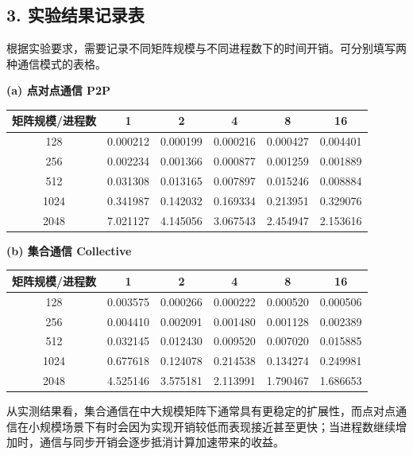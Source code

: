 \documentclass[12pt,a4paper]{ctexart}
\begin{document}
\subsection*{3. 实验结果记录表}
根据实验要求，需要记录不同矩阵规模与不同进程数下的时间开销。可分别填写两种通信模式的表格。

\textbf{(a) 点对点通信 P2P}
\begin{table}[htbp]
  \centering
  \renewcommand{\arraystretch}{1.2}
  \begin{tabular}{c|c|c|c|c|c}
    \toprule
    矩阵规模/进程数 & 1 & 2 & 4 & 8 & 16 \\
    \midrule
    128  & 0.000212 & 0.000199 & 0.000216 & 0.000427 & 0.004401 \\
    256  & 0.002234 & 0.001366 & 0.000877 & 0.001259 & 0.001889 \\
    512  & 0.031308 & 0.013165 & 0.007897 & 0.015246 & 0.008884 \\
    1024 & 0.341987 & 0.142032 & 0.169334 & 0.213951 & 0.329076 \\
    2048 & 7.021127 & 4.145056 & 3.067543 & 2.454947 & 2.153616 \\
    \bottomrule
  \end{tabular}
\end{table}

\textbf{(b) 集合通信 Collective}
\begin{table}[htbp]
  \centering
  \renewcommand{\arraystretch}{1.2}
  \begin{tabular}{c|c|c|c|c|c}
    \toprule
    矩阵规模/进程数 & 1 & 2 & 4 & 8 & 16 \\
    \midrule
    128  & 0.003575 & 0.000266 & 0.000222 & 0.000520 & 0.000506 \\
    256  & 0.004410 & 0.002091 & 0.001480 & 0.001128 & 0.002389 \\
    512  & 0.032145 & 0.012430 & 0.009520 & 0.007020 & 0.015885 \\
    1024 & 0.677618 & 0.124078 & 0.214538 & 0.134274 & 0.249981 \\
    2048 & 4.525146 & 3.575181 & 2.113991 & 1.790467 & 1.686653 \\
    \bottomrule
  \end{tabular}
\end{table}

从实测结果看，集合通信在中大规模矩阵下通常具有更稳定的扩展性，而点对点通信在小规模场景下有时会因为实现开销较低而表现接近甚至更快；当进程数继续增加时，通信与同步开销会逐步抵消计算加速带来的收益。
\end{document}
